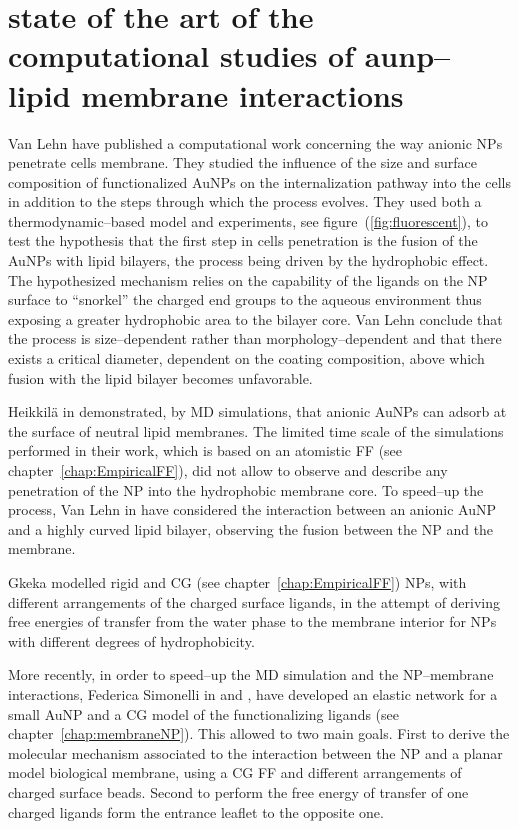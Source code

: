 \section{state of the art of the computational studies of aunp--lipid membrane interactions}
Van Lehn \etal have published a computational work \cite{VanLehn2013} concerning the way anionic \acp{NP} penetrate cells membrane. They studied the influence of the size and surface composition of functionalized \acp{AuNP} on the internalization pathway into the cells in addition to the steps through which the process evolves. They used both a thermodynamic--based model and experiments, see figure~(\ref{fig:fluorescent}), to test the hypothesis that the first step in cells penetration is the fusion of the \acp{AuNP} with lipid bilayers, the process being driven by the hydrophobic effect. The hypothesized mechanism relies on the capability of the ligands on the \ac{NP} surface to ``snorkel'' the charged end groups to the aqueous environment thus exposing a greater hydrophobic area to the bilayer core. Van Lehn \etal conclude that the process is size--dependent rather than morphology--dependent and that there exists a critical diameter, dependent on the coating composition, above which fusion with the lipid bilayer becomes unfavorable.

Heikkilä \etal in \cite{Heikkila2014} demonstrated, by \ac{MD} simulations, that anionic \acp{AuNP} can adsorb at the surface of neutral lipid membranes. The limited time scale of the simulations performed in their work, which is based on an atomistic \ac{FF} (see chapter~\ref{chap:EmpiricalFF}), did not allow to observe and describe any penetration of the \ac{NP} into the hydrophobic membrane core. To speed--up the process, Van Lehn \etal in \cite{VanLehn2014} have considered the interaction between an anionic \ac{AuNP} and a highly curved lipid bilayer, observing the fusion between the \ac{NP} and the membrane.

Gkeka \etal modelled rigid \cite{Gkeka2013} and \ac{CG} \cite{Gkeka2014} (see chapter~\ref{chap:EmpiricalFF}) \acp{NP}, with different arrangements of the charged surface ligands, in the attempt of deriving free energies of transfer from the water phase to the membrane interior for \acp{NP} with different degrees of hydrophobicity.

More recently, in order to speed--up the \ac{MD} simulation and the \ac{NP}--membrane interactions, Federica Simonelli \etal in \cite{simonelliThesis} and \cite{ourPaper}, have developed an elastic network for a small \ac{AuNP} and a \ac{CG} model of the functionalizing ligands (see chapter~\ref{chap:membraneNP}). This allowed to two main goals. First to derive the molecular mechanism associated to the interaction between the \ac{NP} and a planar model biological membrane, using a \ac{CG} \ac{FF} and different arrangements of charged surface beads. Second to perform the free energy of transfer of one charged ligands form the entrance leaflet to the opposite one.


